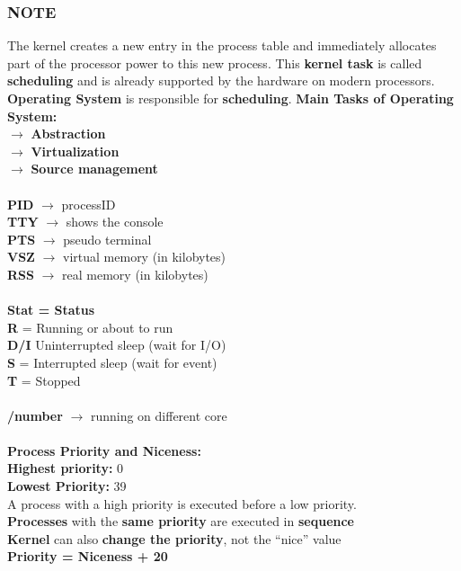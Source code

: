 \documentclass{article}
\begin{document}
\subsubsection*{NOTE}
The kernel creates a new entry in the process table and immediately allocates part of the processor power to this new process. This \textbf{kernel task} is called \textbf{scheduling} and is already supported by the hardware on modern processors. \\
\textbf{Operating System} is responsible for \textbf{scheduling}. 
\textbf{Main Tasks of Operating System:} \\
$\rightarrow$ \textbf{Abstraction} \\
$\rightarrow$ \textbf{Virtualization} \\
$\rightarrow$ \textbf{Source management} \\ \\
\textbf{PID} $\rightarrow$ processID \\
\textbf{TTY} $\rightarrow$ shows the console \\
\textbf{PTS} $\rightarrow$ pseudo terminal \\
\textbf{VSZ} $\rightarrow$ virtual memory (in kilobytes) \\
\textbf{RSS} $\rightarrow$ real memory (in kilobytes) \\ \\
\textbf{Stat = Status} \\
\textbf{R} = Running or about to run \\
\textbf{D/I} Uninterrupted sleep (wait for I/O) \\
\textbf{S} = Interrupted sleep (wait for event) \\
\textbf{T} = Stopped \\ \\
\textbf{/number} $\rightarrow$ running on different core \\ \\
\textbf{Process Priority and Niceness:} \\
\textbf{Highest priority:} 0 \\
\textbf{Lowest Priority:} 39 \\
A process with a high priority is executed before a low priority. \\
\textbf{Processes} with the \textbf{same priority} are executed in \textbf{sequence} \\
\textbf{Kernel} can also \textbf{change the priority}, not the “nice” value \\
\textbf{Priority = Niceness + 20} \\
\end{document}
